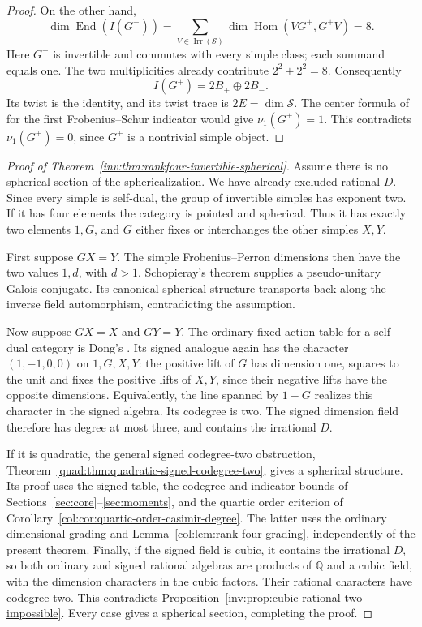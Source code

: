 \documentclass[11pt,a4paper]{article}
\theoremstyle{definition}\newtheorem{definition}[theorem]{Definition}
\theoremstyle{remark}\newtheorem{remark}[theorem]{Remark}
\newcommand{\Q}{\mathbb Q}
\numberwithin{equation}{section}
\begin{document}
\begin{proof}
On the other hand,
\[
 \dim\operatorname{End}(I(G^+))
 =\sum_{V\in\operatorname{Irr}(\mathcal S)}
       \dim\operatorname{Hom}(VG^+,G^+V)=8.
\]
Here $G^+$ is invertible and commutes with every simple class; each
summand equals one. The two multiplicities already contribute
$2^2+2^2=8$. Consequently
\[
 I(G^+)=2B_+\oplus2B_-.
\]
Its twist is the identity, and its twist trace is $2E=\dim\mathcal S$.
The center formula of \cite[Theorem~4.1]{NS} for the first Frobenius--Schur indicator would give
$\nu_1(G^+)=1$. This contradicts $\nu_1(G^+)=0$, since $G^+$ is a
nontrivial simple object.
\end{proof}

\begin{proof}[Proof of Theorem~\ref{inv:thm:rankfour-invertible-spherical}]
Assume there is no spherical section of the sphericalization. We have
already excluded rational $D$. Since every simple is self-dual, the
group of invertible simples has exponent two. If it has four elements
the category is pointed and spherical. Thus it has exactly two
elements $1,G$, and $G$ either fixes or interchanges the other simples
$X,Y$.

First suppose $GX=Y$. The simple Frobenius--Perron dimensions
then have the two values $1,d$, with $d>1$. Schopieray's theorem
\cite[Lemma~3.1]{Schopieray} supplies a pseudo-unitary Galois
conjugate. Its canonical spherical structure transports back along
the inverse field automorphism, contradicting the assumption.

Now suppose $GX=X$ and $GY=Y$. The ordinary fixed-action
table for a self-dual category is Dong's
\cite[Proposition~3.2]{DongFour}. Its signed analogue again has the
character $(1,-1,0,0)$ on $1,G,X,Y$: the positive lift of $G$ has
dimension one, squares to the unit and fixes the positive lifts of
$X,Y$, since their negative lifts have the opposite dimensions.
Equivalently, the line spanned by $1-G$ realizes this character in
the signed algebra. Its codegree is two. The signed dimension field
therefore has degree at most three, and contains the irrational $D$.

If it is quadratic, the general signed codegree-two obstruction,
Theorem~\ref{quad:thm:quadratic-signed-codegree-two}, gives a spherical
structure. Its proof uses the signed table, the codegree and indicator
bounds of Sections~\ref{sec:core}--\ref{sec:moments}, and the quartic
order criterion of Corollary~\ref{col:cor:quartic-order-casimir-degree}.
The latter uses the ordinary dimensional grading and
Lemma~\ref{col:lem:rank-four-grading}, independently of the present
theorem. Finally, if the signed
field is cubic, it contains the irrational $D$, so both ordinary and
signed rational algebras are products of $\Q$ and a cubic
field, with the dimension characters in the cubic factors. Their
rational characters have codegree two. This contradicts
Proposition~\ref{inv:prop:cubic-rational-two-impossible}.
Every case gives a spherical section, completing the proof.
\end{proof}
\end{document}
